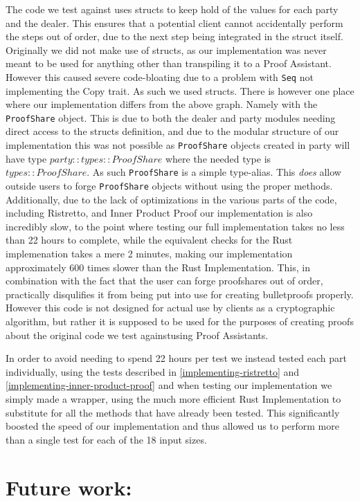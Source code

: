 \documentclass{article}
\begin{document}
The code we test against uses structs to keep hold of the values 
for each party and the dealer. This ensures that a potential client
cannot accidentally perform the steps out of order, due to the next
step being integrated in the struct itself. Originally we did not make 
use of structs, as our implementation was never meant to be used for 
anything other than transpiling it to a Proof Assistant. However this 
caused severe code-bloating due to a problem with \texttt{Seq} not 
implementing the Copy trait. As such we used structs. There is however one 
place where our implementation differs from the above graph. 
Namely with the \texttt{ProofShare} object. This is due to both the dealer 
and party modules needing direct access to the structs definition, and due to 
the modular structure of our implementation this was not possible as
\texttt{ProofShare} objects created in party will have type 
$party::types::ProofShare$ where the needed type is $types::ProofShare$.
As such \texttt{ProofShare} is a simple type-alias. This \textit{does} allow 
outside users to forge \texttt{ProofShare} objects without using the 
proper methods. Additionally, due to the lack of optimizations in the 
various parts of the code, including Ristretto, and Inner Product Proof 
our implementation is also incredibly slow, to the point where testing 
our full implementation takes no less than 22 hours to complete, while 
the equivalent checks for the Rust implemenation takes a mere 2 minutes, 
making our implementation approximately 600 times slower than the Rust 
Implementation. This, in combination with the fact that the user can forge 
proofshares out of order, practically disqulifies it from being put into 
use for creating bulletproofs properly. However this code is not designed 
for actual use by clients as a cryptographic algorithm, but rather it is 
supposed to be used for the purposes of creating proofs about the original 
code we test againstusing Proof Assistants.

In order to avoid needing to spend 22 hours per test we instead tested 
each part individually, using the tests described in 
\ref{implementing-ristretto} and \ref{implementing-inner-product-proof} 
and when testing our implementation we simply made a wrapper, using the 
much more efficient Rust Implementation to substitute for all the methods 
that have already been tested. This significantly boosted the speed of our 
implementation and thus allowed us to perform more than a single test for 
each of the 18 input sizes.

\section{Future work:}
\end{document}
